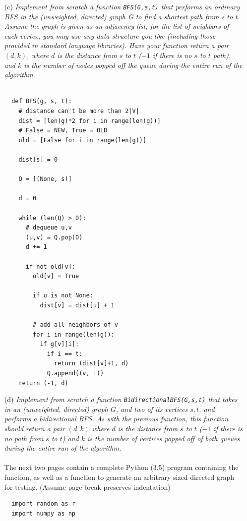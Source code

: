 \documentclass[12pt]{article} \setlength{\oddsidemargin}{0in}
\begin{document}
\begin{enumerate}
  \newpage
  \item[(c)]{\textit{Implement from scratch a function \texttt{BFS(G,s,t)} that performs an ordinary BFS in the (unweighted, directed) graph G to find a shortest path from s to t. Assume
the graph is given as an adjacency list; for the list of neighbors of each vertex,
you may use any data structure you like (including those provided in standard
language libraries). Have your function return a pair $(d, k)$, where $d$ is the distance
from $s$ to $t$ ($-1$ if there is no $s$ to $t$ path), and $k$ is the number of nodes popped
off the queue during the entire run of the algorithm.}}
  \\\\
  \begin{verbatim}
  def BFS(g, s, t):
    # distance can't be more than 2|V|
    dist = [len(g)*2 for i in range(len(g))]
    # False = NEW, True = OLD
    old = [False for i in range(len(g))]

    dist[s] = 0

    Q = [(None, s)]

    d = 0
    
    while (len(Q) > 0):
      # dequeue u,v   
      (u,v) = Q.pop(0)
      d += 1

      if not old[v]:
        old[v] = True
      
        if u is not None:
          dist[v] = dist[u] + 1
      
        # add all neighbors of v
        for i in range(len(g)):
          if g[v][i]:
            if i == t:
              return (dist[v]+1, d)
            Q.append((v, i))
    return (-1, d)
  \end{verbatim}
  \newpage
\item[(d)]{\textit{Implement from scratch a function \texttt{BidirectionalBFS(G,s,t)} that takes in an (unweighted, directed) graph $G$, and two of its vertices $s,t$, and performs a bidirectional BFS. As with the previous function, this function should return a pair
$(d, k)$ where $d$ is the distance from $s$ to $t$ ($-1$ if there is no path from $s$ to $t$) and $k$ is the number of vertices popped off of both queues during the entire run of the
algorithm.}}
  \\\\
  The next two pages contain a complete Python (3.5) program containing the function, as well as a function to generate an arbitrary sized directed graph for testing. (Assume page break preserves indentation) \pagebreak
  \begin{verbatim}
  import random as r
  import numpy as np


\end{verbatim}
\end{enumerate}
\end{document}
